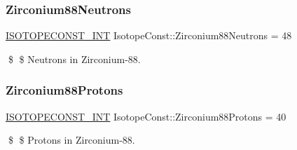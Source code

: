 \subsubsection{\texorpdfstring{Zirconium88\+Neutrons}{Zirconium88Neutrons}}
{\footnotesize\ttfamily \mbox{\hyperlink{group___isotope_const-_macros_ga5f18360b3e99483a35c32d789e62621c}{I\+S\+O\+T\+O\+P\+E\+C\+O\+N\+S\+T\+\_\+\+I\+NT}} Isotope\+Const\+::\+Zirconium88\+Neutrons = 48}

\$ \$ Neutrons in Zirconium-\/88. \mbox{\label{group___isotope_const-_zirconium-_zr88_ga128b96e94a487cdf86ef50dcef766bf3}} 
\subsubsection{\texorpdfstring{Zirconium88\+Protons}{Zirconium88Protons}}
{\footnotesize\ttfamily \mbox{\hyperlink{group___isotope_const-_macros_ga5f18360b3e99483a35c32d789e62621c}{I\+S\+O\+T\+O\+P\+E\+C\+O\+N\+S\+T\+\_\+\+I\+NT}} Isotope\+Const\+::\+Zirconium88\+Protons = 40}

\$ \$ Protons in Zirconium-\/88. 